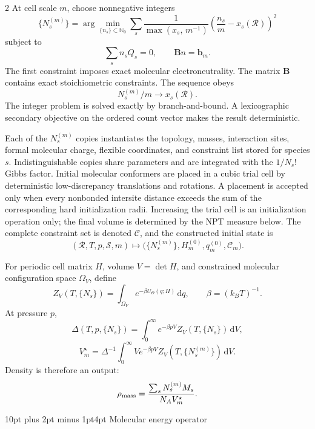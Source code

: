 \documentclass[10pt]{article}
\makeatletter
\renewcommand\section{\@startsection{section}{1}{0pt}%
  {10pt plus 2pt minus 1pt}{4pt}%
  {\large\sffamily\bfseries\color{lithioxfontgreen}}}
\newcommand{\dd}{\,\mathrm d}
\makeatother
\begin{document}
\begin{multicols}{2}
At cell scale \(m\), choose
nonnegative integers
\[
\{N_s^{(m)}\}
=\arg\min_{\{n_s\}\subset\mathbb N_0}
\sum_s\frac{1}{\max(x_s,\,m^{-1})}
\left(\frac{n_s}{m}-x_s(\mathcal R)\right)^2
\]
subject to
\[
\sum_s n_sQ_s=0,\qquad \mathbf Bn=\mathbf b_m.
\]
The first constraint imposes exact molecular electroneutrality. The matrix
\(\mathbf B\) contains exact stoichiometric constraints. The sequence obeys
\[
N_s^{(m)}/m\longrightarrow x_s(\mathcal R).
\]
The integer problem is solved exactly by branch-and-bound.  A lexicographic
secondary objective on the ordered count vector makes the result deterministic.

Each of the \(N_s^{(m)}\) copies instantiates the topology, masses, interaction
sites, formal molecular charge, flexible coordinates, and constraint list stored
for species \(s\).  Indistinguishable copies share parameters and are integrated
with the \(1/N_s!\) Gibbs factor.  Initial molecular conformers are placed in a
cubic trial cell by deterministic low-discrepancy translations and rotations.
A placement is accepted only when every nonbonded intersite distance exceeds the
sum of the corresponding hard initialization radii.  Increasing the trial cell
is an initialization operation only; the final volume is determined by the NPT
measure below.  The complete constraint set is denoted \(\mathcal C\), and the
constructed initial state is
\[
(\mathcal R,T,p,\mathcal S,m)\longmapsto
\bigl(\{N_s^{(m)}\},H_m^{(0)},q_m^{(0)},\mathcal C_m\bigr).
\]

For periodic cell matrix \(H\), volume \(V=\det H\), and constrained molecular
configuration space \(\Omega_V\), define
\[
Z_V(T,\{N_s\})=\int_{\Omega_V}
e^{-\beta U_\Theta(q;H)}\dd q,\qquad \beta=(k_BT)^{-1}.
\]
At pressure \(p\),
\[
\Delta(T,p,\{N_s\})=\int_0^\infty
e^{-\beta pV}Z_V(T,\{N_s\})\dd V,
\]
\[
V_m^\star=\Delta^{-1}\int_0^\infty
V e^{-\beta pV}Z_V(T,\{N_s^{(m)}\})\dd V.
\]
Density is therefore an output:
\[
\rho_{\rm mass}=
\frac{\sum_sN_s^{(m)}M_s}{N_A V_m^\star}.
\]

\section{Molecular energy operator}


\end{multicols}
\end{document}
